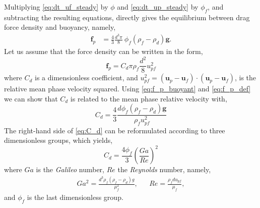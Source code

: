 Multiplying \ref{eq:dt_uf_steady} by $\phi$ and \ref{eq:dt_up_steady} by $\phi_f$, and subtracting the resulting equations,  directly gives the equilibrium between drag force density and buoyancy, namely, 
\begin{align}
     \textbf{f}_p
    &= 
    \frac{4}{3}\frac{d^3 \pi}{8}\ \phi_f (\rho_f -\rho_d ) \textbf{g}. 
    \label{eq:f_p_buoyant}
\end{align}
Let us assume that the force density can be written in the form, 
\begin{equation}
    \textbf{f}_p = C_d  \pi \rho_f \frac{d^2}{8} u_{pf}^2
    \label{eq:f_p_def}
\end{equation}
where $C_d$ is a dimensionless coefficient, and $u_{pf}^2 = (\textbf{u}_p - \textbf{u}_f)\cdot (\textbf{u}_p - \textbf{u}_f)$, is the relative mean phase velocity squared. 
Using \ref{eq:f_p_buoyant}  and \ref{eq:f_p_def} we can show that $C_d$ is related to the mean phase relative velocity with, 
\begin{equation}
    C_d  
    = 
    \frac{4}{3}
    \frac{d \phi_f (\rho_f -\rho_d ) \textbf{g}}{\rho_f u_{pf}^2}
    \label{eq:C_d}
\end{equation}
The right-hand side of \ref{eq:C_d} can be reformulated according to three dimensionless groups, which yields, 
\begin{equation}
    C_d = 
    \frac{4\phi_f}{3} \left(\frac{Ga}{Re}\right)^2
    \label{eq:C_d_adim}
\end{equation}
where $Ga$ is the \textit{Galileo} number, $Re$ the \textit{Reynolds} number, namely, 
\begin{align}
    Ga^2 = \frac{
    d^3
    \rho_f
    (\rho_f -\rho_d ) g
}{\mu_f^2},
&& 
Re =   \frac{\rho_f d u_{pf}}{\mu_f},
\end{align}
and $\phi_f$ is the last dimensionless group. 

